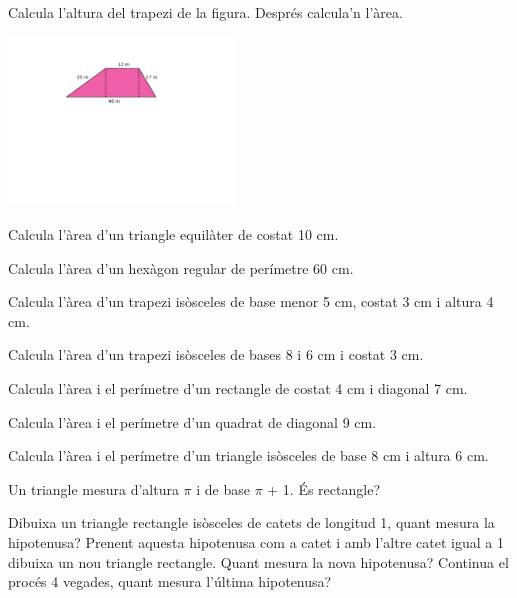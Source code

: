 \begin{activitats}
\begin{mylist}
\exer \hot Calcula l'altura del trapezi de la figura. Després calcula'n l'àrea.

\begin{center}
	\includegraphics[width=6cm]{img-09/trapezi-exer}
\end{center}

\exer  Calcula l'àrea d'un triangle equilàter de costat 10 cm.

\exer  Calcula l'àrea d'un hexàgon regular de perímetre 60 cm.

\exer  Calcula l'àrea d'un trapezi isòsceles de base menor 5 cm, costat 3 cm i altura 4 cm.

\exer  Calcula l'àrea d'un trapezi isòsceles de bases 8 i 6 cm i costat 3 cm.

\exer  Calcula l'àrea i el perímetre d'un rectangle de costat 4 cm i diagonal 7 cm.

\exer  Calcula l'àrea i el perímetre d'un quadrat de diagonal 9 cm.

\exer  Calcula l'àrea i el perímetre d'un triangle isòsceles de base 8 cm i altura 6 cm.

\exer  Un triangle mesura d'altura $\pi$ i de base $\pi$ + 1. És rectangle?

\exer  Dibuixa un triangle rectangle isòsceles de catets de longitud 1, quant mesura la hipotenusa? Prenent aquesta hipotenusa com a catet i amb l'altre catet igual a 1 dibuixa un nou triangle rectangle. Quant mesura la nova hipotenusa? Continua el procés 4 vegades, quant mesura l'última hipotenusa?


\end{mylist}
\end{activitats}
